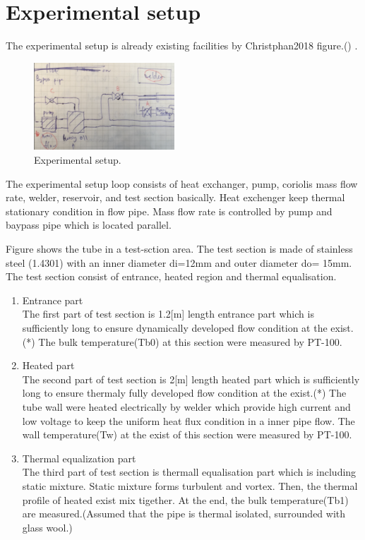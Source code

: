 \documentclass[conference]{IEEEtran}
\begin{document}
\section{Experimental setup}
The experimental setup is already existing facilities by Christphan2018 figure.() .
\begin{figure}[htbp]
  \centering
  \includegraphics[width=0.47\textwidth,natwidth=610,natheight=642]{fig/experimental_setup.pdf}
  \caption{Experimental setup.}
  \label{experimental_setup}
  \vspace{-2zh}
\end{figure}
The experimental setup loop consists of heat exchanger, pump, coriolis mass flow rate, welder, reservoir, and test section basically.
Heat exchenger keep thermal stationary condition in flow pipe.
Mass flow rate is controlled by pump and baypass pipe which is located parallel.

Figure\label{thermal_boundary_layer_development} shows the tube in a test-sction area.
The test section is made of stainless steel (1.4301) with an inner diameter di=12mm and outer diameter do= 15mm.
The test section consist of entrance, heated region and thermal equalisation.
\begin{enumerate}
  \item Entrance part\\
  The first part of test section is 1.2[m] length entrance part which is sufficiently long to ensure dynamically developed flow condition at the exist.(*) The bulk temperature(Tb0) at this section were measured by PT-100.
  \item Heated part\\
  The second part of test section is 2[m] length heated part which is sufficiently long to ensure thermaly fully developed flow condition at the exist.(*) The tube wall were heated electrically by welder which provide high current and low voltage to keep the uniform heat flux condition in a inner pipe flow. The wall temperature(Tw) at the exist of this section were measured by PT-100.
  \item Thermal equalization part\\
  The third part of test section is thermall equalisation part which is including static mixture. Static mixture forms turbulent and vortex. Then, the thermal profile of heated exist mix tigether. At the end, the bulk temperature(Tb1) are measured.(Assumed that the pipe is thermal isolated, surrounded with glass wool.)
\end{enumerate}
\end{document}
